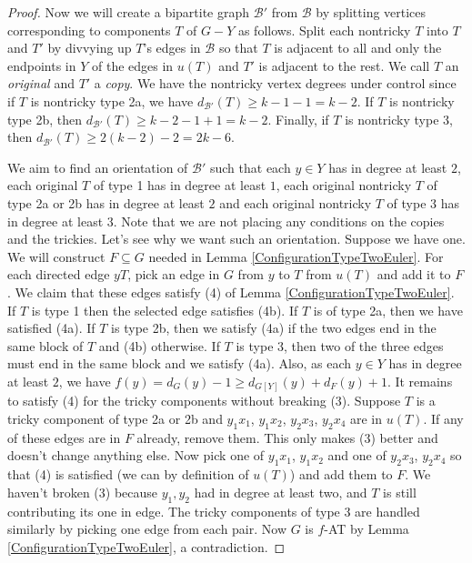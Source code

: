 \documentclass[12pt]{article}
\theoremstyle{plain}
\theoremstyle{definition}
\theoremstyle{remark}
\newcommand{\fancy}[1]{\mathcal{#1}}
\newcommand{\B}{\fancy{B}}
\begin{document}
\begin{proof}
Now we will create a bipartite graph $\B'$ from $\B$ by splitting vertices corresponding to components $T$ of $G-Y$ as follows. Split each nontricky $T$ into $T$ and $T'$ by divvying up $T$'s edges in $\B$ so that $T$ is adjacent to all and only the endpoints in $Y$ of the edges in $u(T)$ and $T'$ is adjacent to the rest.  We call $T$ an \emph{original} and $T'$ a \emph{copy}.  We have the nontricky vertex degrees under control since if $T$ is nontricky type 2a, we have $d_{\B'}(T) \geq k-1 - 1 = k-2$.  If $T$ is nontricky type 2b, then $d_{\B'}(T) \geq k-2 -1 + 1 = k-2$. Finally, if $T$ is nontricky type 3, then $d_{\B'}(T) \geq 2(k-2) - 2 = 2k-6$. 

We aim to find an orientation of $\B'$ such that each $y \in Y$ has in degree at least $2$, each original $T$ of type 1 has in degree at least $1$, each original nontricky $T$ of type 2a or 2b has in degree at least $2$ and each original nontricky $T$ of type 3 has in degree at least $3$.  Note that we are not placing any conditions on the copies and the trickies.  Let's see why we want such an orientation.  Suppose we have one.  We will construct $F \subseteq G$ needed in Lemma \ref{ConfigurationTypeTwoEuler}.  For each directed edge $yT$, pick an edge in $G$ from $y$ to $T$ from $u(T)$ and add it to $F$. We claim that these edges satisfy (4) of Lemma \ref{ConfigurationTypeTwoEuler}.  If $T$ is type 1 then the selected edge satisfies (4b).  If $T$ is of type 2a, then we have satisfied (4a).  If $T$ is type 2b, then we satisfy (4a) if the two edges end in the same block of $T$ and (4b) otherwise.  If $T$ is type 3, then two of the three edges must end in the same block and we satisfy (4a). Also, as each $y \in Y$ has in degree at least $2$, we have $f(y) = d_G(y) - 1 \geq d_{G[Y]}(y) + d_F(y) + 1$.  It remains to satisfy (4) for the tricky components without breaking (3).  Suppose $T$ is a tricky component of type 2a or 2b and $y_1x_1$, $y_1x_2$, $y_2x_3$, $y_2x_4$ are in $u(T)$.  If any of these edges are in $F$ already, remove them.  This only makes (3) better and doesn't change anything else.  Now pick one of $y_1x_1$, $y_1x_2$ and one of $y_2x_3$, $y_2x_4$ so that (4) is satisfied (we can by definition of $u(T)$) and add them to $F$.  We haven't broken (3) because $y_1, y_2$ had in degree at least two, and $T$ is still contributing its one in edge. The tricky components of type 3 are handled similarly by picking one edge from each pair. Now $G$ is $f$-AT by Lemma \ref{ConfigurationTypeTwoEuler}, a contradiction.


\end{proof}
\end{document}
